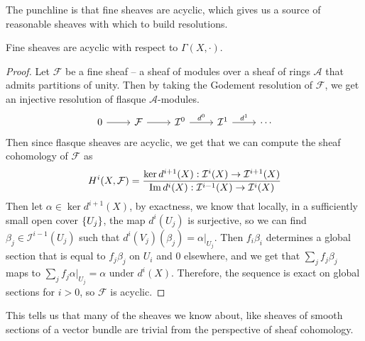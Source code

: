 %
The punchline is that fine sheaves are acyclic, which gives us a source of reasonable
sheaves with which to build resolutions.
%
\begin{thm}
Fine sheaves are acyclic with respect to $\Gamma(X,\cdot)$.
\end{thm}
%
\begin{proof}
Let $\mathcal{F}$ be a fine sheaf -- a sheaf of modules over a sheaf of rings
$\mathcal{A}$ that admits partitions of unity. Then by taking the
Godement resolution of $\mathcal{F}$, we get an injective resolution of
flasque $\mathcal{A}$-modules.
\[\begin{tikzcd}
0 \ar[r] & \mathcal{F} \ar[r] & \mathcal{I}^0 \ar[r, "d^0"] & \mathcal{I}^1 \ar[r, "d^1"]
& \cdots
\end{tikzcd}\]
Then since flasque sheaves are acyclic, we get that we can compute the sheaf
cohomology of $\mathcal{F}$ as
\[
H^i(X, \mathcal{F})
= \frac{\ker d^{i+1}(X) : \mathcal{I}^i(X) \to \mathcal{I}^{i+1}(X)}
{\operatorname{Im} d^i(X) : \mathcal{I}^{i-1}(X) \to \mathcal{I}^i(X)}
\]
Then let $\alpha \in \ker d^{i+1}(X)$, by exactness, we know that locally, in a
sufficiently small open cover $\left\lbrace U_j \right\rbrace$, the map $d^{i}(U_j)$ is surjective,
so we can find $\beta_j \in \mathcal{I}^{i-1}(U_j)$ such that
$d^i(V_j)(\beta_j) = \alpha\vert_{U_j}$. Then $f_i\beta_i$ determines a global
section that is equal to $f_j\beta_j$ on $U_i$ and $0$ elsewhere, and we get that
$\sum_jf_j\beta_j$ maps to $\sum_j f_j\alpha\vert_{U_j} = \alpha$ under $d^i(X)$.
Therefore, the sequence is exact on global sections for $i > 0$, so $\mathcal{F}$
is acyclic.
\end{proof}
%
This tells us that many of the sheaves we know about, like sheaves of smooth sections
of a vector bundle are trivial from the perspective of sheaf cohomology.
%